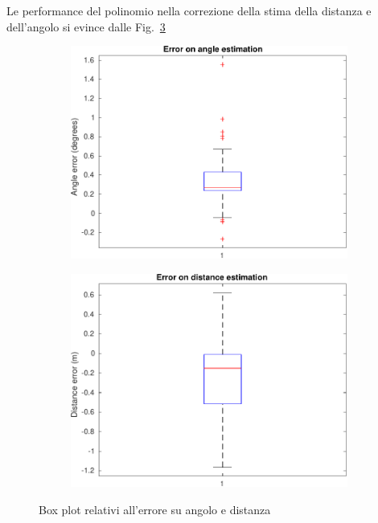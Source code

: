 \documentclass[a4paper]{article}
\begin{document}
	Le performance del polinomio nella correzione della stima della distanza e dell'angolo si evince dalle Fig.~\ref{fig:boxes_plot}

	\begin{figure}[ht]
		\begin{subfigure}{.49\textwidth}
			\centering
			\includegraphics[width=1\linewidth]{./img/angle_error.pdf}  
			\label{fig:angle_plot}
		\end{subfigure}
		\begin{subfigure}{.49\textwidth}
			\centering
			\includegraphics[width=1\linewidth]{./img/distance_error.pdf}  
			\label{fig:distance_plot}
		\end{subfigure}
		\caption{Box plot relativi all'errore su angolo e distanza}
		\label{fig:boxes_plot}
	\end{figure}
\end{document}
